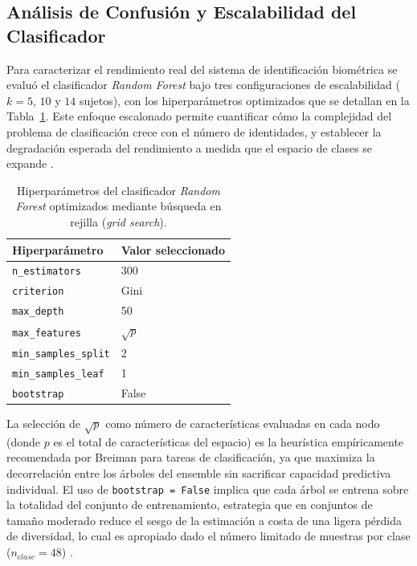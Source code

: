 \subsection{Análisis de Confusión y Escalabilidad del Clasificador}

Para caracterizar el rendimiento real del sistema de identificación biométrica se evaluó el clasificador \textit{Random Forest} bajo tres configuraciones de escalabilidad ($k = 5$, $10$ y $14$ sujetos), con los hiperparámetros optimizados que se detallan en la Tabla~\ref{tab:hiperparametros_rf}.
Este enfoque escalonado permite cuantificar cómo la complejidad del problema de clasificación crece con el número de identidades, y establecer la degradación esperada del rendimiento a medida que el espacio de clases se expande \cite{breiman2001}.
\begin{table}[h!]
	\centering
	\caption{Hiperparámetros del clasificador \textit{Random Forest} optimizados mediante búsqueda en rejilla (\textit{grid search}).}
	\label{tab:hiperparametros_rf}
	\vspace{0.2cm}
	\begin{tabular}{ll}
		\toprule
		\textbf{Hiperparámetro} & \textbf{Valor seleccionado} \\
		\midrule
		\texttt{n\_estimators}      & 300 \\
		\texttt{criterion}          & Gini \\
		\texttt{max\_depth}         & 50 \\
		\texttt{max\_features}      & $\sqrt{p}$ \\
		\texttt{min\_samples\_split} & 2 \\
		\texttt{min\_samples\_leaf}  & 1 \\
		\texttt{bootstrap}          & False \\
		\bottomrule
	\end{tabular}
\end{table}

La selección de $\sqrt{p}$ como número de características evaluadas en cada nodo (donde $p$ es el total de características del espacio) es 
la heurística empíricamente recomendada por Breiman \cite{breiman2001} para tareas de clasificación, ya que maximiza la decorrelación entre los árboles del ensemble sin sacrificar capacidad predictiva individual.
El uso de \texttt{bootstrap = False} implica que cada árbol se entrena sobre la totalidad del conjunto de entrenamiento, estrategia que en conjuntos de tamaño moderado reduce el sesgo de la estimación a costa de una ligera pérdida de diversidad, lo cual es apropiado dado el número limitado de muestras por clase ($n_{clase} = 48$) \cite{breiman2001}.
